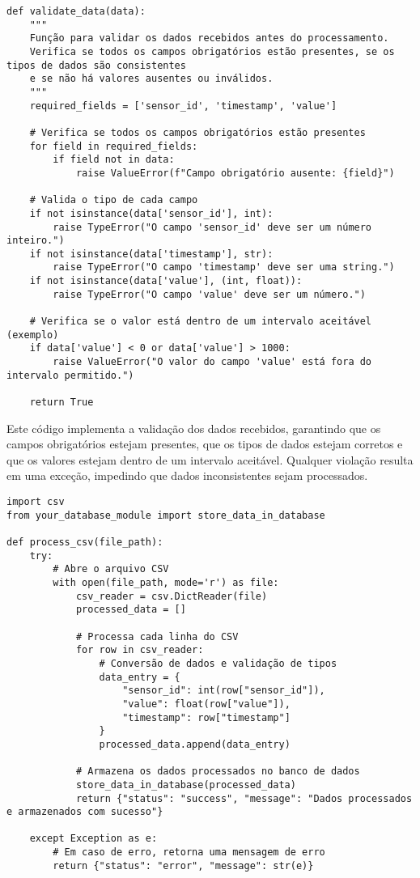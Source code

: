 \begin{verbatim}
def validate_data(data):
    """
    Função para validar os dados recebidos antes do processamento.
    Verifica se todos os campos obrigatórios estão presentes, se os tipos de dados são consistentes
    e se não há valores ausentes ou inválidos.
    """
    required_fields = ['sensor_id', 'timestamp', 'value']
    
    # Verifica se todos os campos obrigatórios estão presentes
    for field in required_fields:
        if field not in data:
            raise ValueError(f"Campo obrigatório ausente: {field}")
    
    # Valida o tipo de cada campo
    if not isinstance(data['sensor_id'], int):
        raise TypeError("O campo 'sensor_id' deve ser um número inteiro.")
    if not isinstance(data['timestamp'], str):
        raise TypeError("O campo 'timestamp' deve ser uma string.")
    if not isinstance(data['value'], (int, float)):
        raise TypeError("O campo 'value' deve ser um número.")
    
    # Verifica se o valor está dentro de um intervalo aceitável (exemplo)
    if data['value'] < 0 or data['value'] > 1000:
        raise ValueError("O valor do campo 'value' está fora do intervalo permitido.")
    
    return True
\end{verbatim}

Este código implementa a validação dos dados recebidos, garantindo que os campos obrigatórios estejam presentes, que os tipos de dados estejam corretos e que os valores estejam dentro de um intervalo aceitável. Qualquer violação resulta em uma exceção, impedindo que dados inconsistentes sejam processados.

\label{Anexo:CodigoProcessamentoDados}

\begin{verbatim}
import csv
from your_database_module import store_data_in_database

def process_csv(file_path):
    try:
        # Abre o arquivo CSV
        with open(file_path, mode='r') as file:
            csv_reader = csv.DictReader(file)
            processed_data = []

            # Processa cada linha do CSV
            for row in csv_reader:
                # Conversão de dados e validação de tipos
                data_entry = {
                    "sensor_id": int(row["sensor_id"]),
                    "value": float(row["value"]),
                    "timestamp": row["timestamp"]
                }
                processed_data.append(data_entry)

            # Armazena os dados processados no banco de dados
            store_data_in_database(processed_data)
            return {"status": "success", "message": "Dados processados e armazenados com sucesso"}

    except Exception as e:
        # Em caso de erro, retorna uma mensagem de erro
        return {"status": "error", "message": str(e)}
\end{verbatim}


